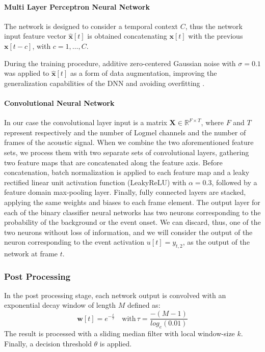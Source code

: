 \paragraph{Multi Layer Perceptron Neural Network}
The network is designed to consider a temporal context  $C$, thus the network input  feature vector  $\hat{\mathbf{x}}[t]$ is obtained concatenating $\mathbf{x}[t]$ with the previous $\mathbf{x}[t - c]$, with $c = 1, \dots, C$. 
 
During the training procedure, additive zero-centered Gaussian noise with $\sigma=0.1$ was applied to $\hat{\mathbf{x}}[t]$ as a form of data augmentation, improving the generalization capabilities of the DNN and avoiding overfitting \cite{marchi2017deep}.


\paragraph{Convolutional Neural Network}
\label{ssec:CNN}

In our case the convolutional layer input is a matrix $\mathbf{X} \in \mathbb{R}^{F \times T}$, where $F$ and $T$ represent respectively and the number of Logmel channels and the number of frames of the acoustic signal.
When we combine the two aforementioned feature sets, we process them with two separate sets of convolutional layers, gathering two feature maps that are concatenated along the feature axis. Before concatenation, batch normalization \cite{ioffe2015batch} is applied to each feature map and a leaky rectified linear unit activation function (LeakyReLU) with $\alpha=0.3$, followed by a feature domain max-pooling layer.
Finally, fully connected layers are stacked, applying the same weights and biases to each frame element. The output layer for each of the binary classifier neural networks has two neurons corresponding to the probability of the background or the event onset. We can discard, thus, one of the two neurons without loss of information, and we will consider the output of the neuron corresponding to the event activation $u[t] = y_{t,2}$, as the output of the network at frame $t$.


\subsubsection{Post Processing}
In the post processing stage, each network output is convolved with an exponential decay window of length $M$ defined as:
\begin{equation}
	\mathbf{w}[t]= e^{-\frac{t}{\tau}} \quad \text{with}  \, \tau =  \frac{-(M-1)}{log_e(0.01)}
\end{equation}
The result is processed with a sliding median filter with local window-size $k$. Finally, a decision threshold $\theta$ is applied.

